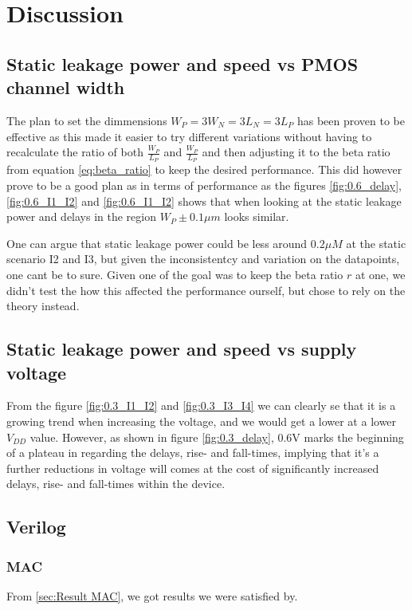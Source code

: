 \section{Discussion}

\subsection{Static leakage power and speed vs PMOS channel width}
The plan to set the dimmensions $W_P=3W_N=3L_N=3L_P$ has been proven to be effective as this made it easier to try different variations without having to recalculate the ratio of both $\frac{W_P}{L_P}$ and $\frac{W_P}{L_P}$ and then adjusting it to the beta ratio from equation \ref{eq:beta_ratio} to keep the desired performance. This did however prove to be a good plan as in terms of performance as the figures \ref{fig:0.6_delay}, \ref{fig:0.6_I1_I2} and \ref{fig:0.6_I1_I2} shows that when looking at the static leakage power and delays in the region $W_P \pm 0.1\mu m$ looks similar.

 One can argue that static leakage power could be less around $0.2\mu M$ at the static scenario I2 and I3, but given the inconsistentcy and variation on the datapoints, one cant be to sure. Given one of the goal was to keep the beta ratio $r$ at one, we didn't test the how this affected the performance ourself, but chose to rely on the theory instead.

 \subsection{Static leakage power and speed vs supply voltage}
 From the figure \ref{fig:0.3_I1_I2} and \ref{fig:0.3_I3_I4} we can clearly se that it is a growing trend when increasing the voltage, and we would get a lower at a lower $V_{DD}$ value. However, as shown in figure \ref{fig:0.3_delay}, 0.6V marks the beginning of a plateau in regarding the delays, rise- and fall-times, implying that it's a further reductions in voltage will comes at the cost of significantly increased delays, rise- and fall-times within the device.

 \subsection{Verilog}
 \subsubsection{MAC}
 From \ref{sec:Result MAC}, we got results we were satisfied by.
